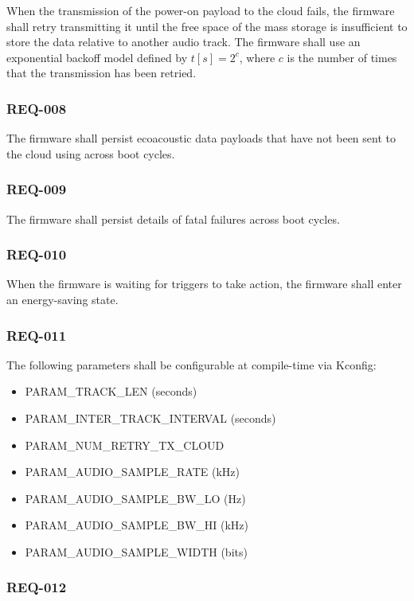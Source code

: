 \documentclass[11pt,a4paper]{article}
\begin{document}
When the transmission of the power-on payload to the cloud fails, the firmware
shall retry transmitting it until the free space of the mass storage is
insufficient to store the data relative to another audio track. The firmware
shall use an exponential backoff model defined by $t[s]=2^c$, where $c$ is the
number of times that the transmission has been retried.

\subsubsection{REQ-008}

The firmware shall persist ecoacoustic data payloads that have not been sent to
the cloud using across boot cycles.

\subsubsection{REQ-009}

The firmware shall persist details of fatal failures across boot cycles.

\subsubsection{REQ-010}

When the firmware is waiting for triggers to take action, the firmware shall
enter an energy-saving state.

\subsubsection{REQ-011}

The following parameters shall be configurable at compile-time via Kconfig:

\begin{itemize}
    \item PARAM\_TRACK\_LEN (seconds)
    \item PARAM\_INTER\_TRACK\_INTERVAL (seconds)
    \item PARAM\_NUM\_RETRY\_TX\_CLOUD
    \item PARAM\_AUDIO\_SAMPLE\_RATE (kHz)
    \item PARAM\_AUDIO\_SAMPLE\_BW\_LO (Hz)
    \item PARAM\_AUDIO\_SAMPLE\_BW\_HI (kHz)
    \item PARAM\_AUDIO\_SAMPLE\_WIDTH (bits)
\end{itemize}

\subsubsection{REQ-012}
\end{document}
